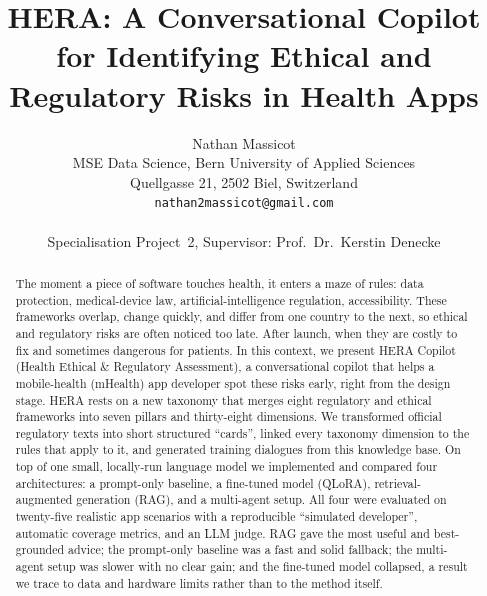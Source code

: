 \documentclass[11pt]{article}
\title{HERA: A Conversational Copilot for Identifying Ethical and\\
       Regulatory Risks in Health Apps}
\author{Nathan Massicot \\
        MSE Data Science, Bern University of Applied Sciences \\
        Quellgasse 21, 2502 Biel, Switzerland \\
        \texttt{nathan2massicot@gmail.com} \\
        \\
        \small Specialisation Project~2, Supervisor: Prof.\ Dr.\ Kerstin Denecke}
\begin{document}
\maketitle
\begin{abstract}
The moment a piece of software touches health, it enters a maze of rules: data
protection, medical-device law, artificial-intelligence regulation, accessibility.
These frameworks overlap, change quickly, and differ from one country to the next,
so ethical and regulatory risks are often noticed too late. After launch, when they
are costly to fix and sometimes dangerous for patients. In this context, we present HERA Copilot
(Health Ethical \& Regulatory Assessment), a conversational copilot that helps a
mobile-health (mHealth) app developer spot these risks early, right from the design
stage. HERA rests on a new taxonomy that merges eight regulatory and ethical
frameworks into seven pillars and thirty-eight dimensions. We transformed official
regulatory texts into short structured ``cards'', linked every taxonomy dimension to
the rules that apply to it, and generated training dialogues from this knowledge base.
On top of one small, locally-run language model we implemented and compared four
architectures: a prompt-only baseline, a fine-tuned model (QLoRA), retrieval-augmented
generation (RAG), and a multi-agent setup. All four were evaluated on twenty-five
realistic app scenarios with a reproducible ``simulated developer'', automatic
coverage metrics, and an LLM judge. RAG gave the most useful and best-grounded advice;
the prompt-only baseline was a fast and solid fallback; the multi-agent setup was
slower with no clear gain; and the fine-tuned model collapsed, a result we trace to
data and hardware limits rather than to the method itself.
\end{abstract}
\end{document}
